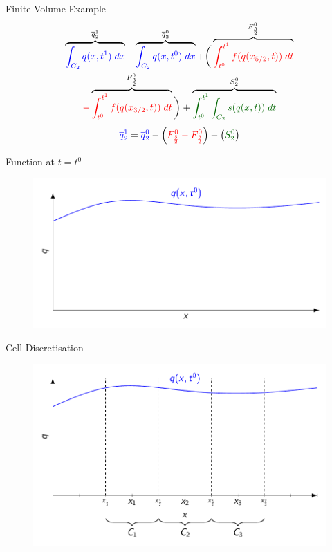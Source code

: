\documentclass[]{beamer}
\begin{document}
\begin{frame}{Finite Volume Example}	
	\begin{multline*}
	\overbrace{ {\color{blue}\int_{C_2} q(x,t^1) \; dx}}^{\overline{q}^1_2} {\color{blue}-} \overbrace{ {\color{blue}\int_{C_2} q(x,t^0) \; dx } }^{\overline{q}^0_2} +  \bigg( \overbrace{ {\color{red}\int_{t^0}^{t^1} f(q(x_{5/2},t)) \; dt}}^{F^0_{\frac{5}{2}}} \\ {\color{red}-} \overbrace{{\color{red}\int_{t^0}^{t^1} f(q(x_{3/2},t)) \; dt}}^{F^0_{\frac{3}{2}}}  \bigg) +  \overbrace{ {\color{green!40!black}\int_{t^0}^{t^1} \int_{C_2} s(q(x,t)) \; dt }}^{S^0_{2}}
	\end{multline*}
	\pause 
	\begin{equation*}
	{\color{blue}\overline{q}^1_2 } = {\color{blue}\overline{q}^0_2} - \left(  {\color{red}F^0_{\frac{5}{2}} - F^0_{\frac{3}{2}} } \right) -  \left({\color{green!40!black}S^0_2}\right)
	\end{equation*}	
\end{frame}
\begin{frame}{Function at $t=t^0$}
	\begin{figure}
		\includegraphics[width=\textwidth]{./Pics/FVMpicture/Function.pdf}
	\end{figure}
\end{frame}
\begin{frame}{Cell Discretisation}
	\begin{figure}
		\includegraphics[width=\textwidth]{./Pics/FVMpicture/Cells.pdf}
	\end{figure}
\end{frame}
\end{document}
